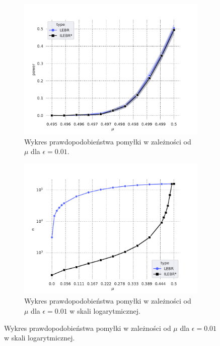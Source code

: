 \documentclass[inzynierska]{pwr_wmat_praca_dyplomowa}
\theoremstyle{plain}
\numberwithin{theorem}{chapter}
\theoremstyle{definition}
\numberwithin{theorem}{chapter}
\begin{document}
	\begin{figure}
		\captionsetup[subfigure]{width=0.8\textwidth}
		\centering
		\begin{subfigure}{1\textwidth}
			\includegraphics[width=1\linewidth]{imagens/test_powrs_same_n_max.pdf}
			\caption{Wykres prawdopodobieństwa pomyłki w zależności od $\mu$ dla $\epsilon=0.01$.}
			\label{fig:power_same_n_max}
		\end{subfigure}
		\begin{subfigure}{.5\textwidth}
			\centering
			\includegraphics[width=1\linewidth]{imagens/needed_games_to_play_same_n_max_log.pdf}
			\caption{Wykres prawdopodobieństwa pomyłki w zależności od $\mu$ dla $\epsilon=0.01$ w skali logarytmicznej.}
			\label{fig:power_same_n_max_log}

\end{subfigure}
\end{figure}
\end{document}
